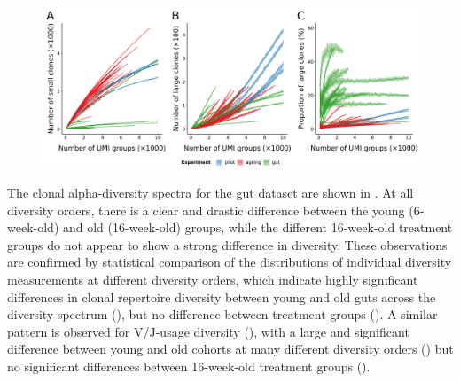\begin{figure}
\centering
\includegraphics[width = \textwidth]{_Figures/png/igseq-rarefied-clone-counts-size}
\begin{subfigure}{0em}
\label{fig:igseq-rarefied-clone-counts-small}
\end{subfigure}
\begin{subfigure}{0em}
\label{fig:igseq-rarefied-clone-counts-large}
\end{subfigure}
\begin{subfigure}{0em}
\label{fig:igseq-rarefied-clone-counts-large-pc}
\end{subfigure}
\label{fig:igseq-rarefied-clone-counts-size}
\end{figure}

The clonal alpha-diversity spectra for the gut dataset are shown in . At all diversity orders, there is a clear and drastic difference between the young (6-week-old) and old (16-week-old) groups, while the different 16-week-old treatment groups do not appear to show a strong difference in diversity. These observations are confirmed by statistical comparison of the distributions of individual diversity measurements at different diversity orders, which indicate highly significant differences in clonal repertoire diversity between young and old guts across the diversity spectrum (), but no difference between treatment groups (). A similar pattern is observed for V/J-usage diversity (), with a large and significant difference between young and old cohorts at many different diversity orders () but no significant differences between 16-week-old treatment groups ().

